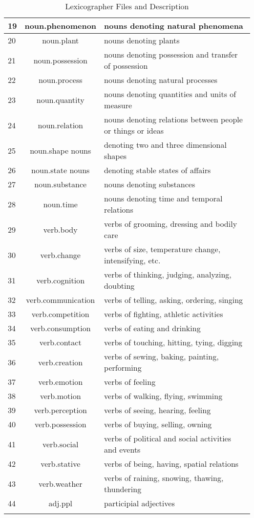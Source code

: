 \begin{center}
\begin{longtable}{|l|c|p{7cm}|}
19 & noun.phenomenon & nouns denoting natural phenomena\\ \hline
20 & noun.plant & nouns denoting plants\\ \hline
21 & noun.possession & nouns denoting possession and transfer of possession\\ \hline
22 & noun.process & nouns denoting natural processes\\ \hline
23 & noun.quantity & nouns denoting quantities and units of measure\\ \hline
24 & noun.relation & nouns denoting relations between people or things or ideas\\ \hline
25 & noun.shape	nouns & denoting two and three dimensional shapes\\ \hline
26 & noun.state	nouns & denoting stable states of affairs\\ \hline
27 & noun.substance & nouns denoting substances\\ \hline
28 & noun.time & nouns denoting time and temporal relations\\ \hline
29 & verb.body & verbs of grooming, dressing and bodily care\\ \hline
30 & verb.change & verbs of size, temperature change, intensifying, etc.\\ \hline
31 & verb.cognition & verbs of thinking, judging, analyzing, doubting\\ \hline
32 & verb.communication & verbs of telling, asking, ordering, singing\\ \hline
33 & verb.competition & verbs of fighting, athletic activities\\ \hline
34 & verb.consumption & verbs of eating and drinking\\ \hline
35 & verb.contact & verbs of touching, hitting, tying, digging\\ \hline
36 & verb.creation & verbs of sewing, baking, painting, performing\\ \hline
37 & verb.emotion & verbs of feeling\\ \hline
38 & verb.motion & verbs of walking, flying, swimming\\ \hline
39 & verb.perception & verbs of seeing, hearing, feeling\\ \hline
40 & verb.possession & verbs of buying, selling, owning\\ \hline
41 & verb.social & verbs of political and social activities and events\\ \hline
42 & verb.stative & verbs of being, having, spatial relations\\ \hline
43 & verb.weather & verbs of raining, snowing, thawing, thundering\\ \hline
44 & adj.ppl & participial adjectives\\ \hline
\caption{Lexicographer Files and Description} %
\label{tab:lexicographerFiles}
\end{longtable}
\end{center}




















